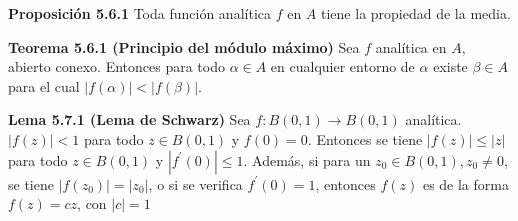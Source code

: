 \documentclass[a4paper, 11pt]{extarticle}
\newcommand{\tma}[1]{\textcolor{rojo}{\textbf{Teorema #1}}}
\newcommand{\propo}[1]{\textcolor{rojo}{\textbf{Proposición #1}}}
\newcommand{\lema}[1]{\textcolor{rosa}{\textbf{Lema #1}}}
\begin{document}
\begin{multicols*}{2}
\propo{5.6.1} Toda función analítica \(f\) en \(A\) tiene la propiedad de
la media.

\tma{5.6.1 (Principio del módulo máximo)}
Sea \(f\) analítica en \(A\), abierto conexo. Entonces para todo \(\alpha
\in A\) en cualquier entorno de \(\alpha\) existe \(\beta \in A\) para el
cual \(|f(\alpha)| < |f(\beta)|\).

\lema{5.7.1 (Lema de Schwarz)}
Sea \(f: B(0,1) \rightarrow  B(0,1)\) analítica. \(|f(z)| < 1\) para todo \(z
\in B(0,1)\) y \(f(0) = 0\). Entonces se tiene \(|f(z)| \leq|z|\) para todo
 \(z \in B(0,1)\) y \(\left|f^{\prime}(0)\right| \leq 1\). 
Además, si para un \(z_{0} \in B(0,1), z_{0} \neq 0\), se tiene 
\(\left|f\left(z_{0}\right)\right|=\left|z_{0}\right|\), o si se verifica 
\(f^{\prime}(0)=1\), entonces \(f(z)\) es de la forma \(f(z)=c z\), con \(|c|=1\)

\end{multicols*}
\pagebreak
\end{document}

